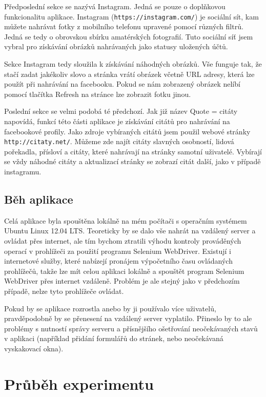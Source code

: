 \documentclass[thesis=M,czech]{FITthesis}[2013/05/10]
\begin{document}
Předposlední sekce se nazývá Instagram. Jedná se pouze o doplňkovou funkcionalitu aplikace. Instagram (\verb|https://instagram.com/|) je sociální sít, kam můžete nahrávat fotky z mobilního telefonu upravené pomocí různých filtrů. Jedná se tedy o obrovskou sbírku amatérských fotografií. Tuto sociální síť jsem vybral pro získávání obrázků nahrávaných jako statusy uložených účtů. 

Sekce Instagram tedy sloužila k získávání náhodných obrázků. Vše funguje tak, že stačí zadat jakékoliv slovo a stránka vrátí obrázek včetně URL adresy, která lze použít při nahrávání na facebooku. Pokud se nám zobrazený obrázek nelíbí pomocí tlačítka Refresh na stránce lze zobrazit fotku jinou.

Poslední sekce se velmi podobá té předchozí. Jak již název Quote = citáty napovídá, funkcí této části aplikace je získávání citátů pro nahrávání na facebookové profily. Jako zdroje vybíraných citátů jsem použil webové stránky \verb|http://citaty.net/|. Můžeme zde najít citáty slavných osobností, lidová pořekadla, přísloví a citáty, které nahrávají na stránky samotní uživatelé. Vybírají se vždy náhodné citáty a aktualizací stránky se zobrazí citát další, jako v případě instagramu.



\section{Běh aplikace}

Celá aplikace byla spouštěna lokálně na mém počítači s operačním systémem Ubuntu Linux 12.04 LTS. Teoreticky by se dalo vše nahrát na vzdálený server a ovládat přes internet, ale tím bychom ztratili výhodu kontroly prováděných operací v prohlížeči za použití programu Selenium WebDriver. Existují i internetové služby, které nabízejí pronájem výpočetního času ovládaných prohlížečů, takže lze mít celou aplikaci lokálně a spouštět program Selenium WebDriver přes internet vzdáleně. Problém je ale stejný jako v předchozím případě, nelze tyto prohlížeče ovládat.

Pokud by se aplikace rozrostla anebo by ji používalo více uživatelů, pravděpodobně by se přenesení na vzdálený server vyplatilo. Přineslo by to ale problémy s nutností správy serveru a přísnějšího ošetřování neočekávaných stavů v aplikaci (například přidání formulářů do stránek, nebo neočekávaná vyskakovací okna).





\chapter{Průběh experimentu}
\end{document}
